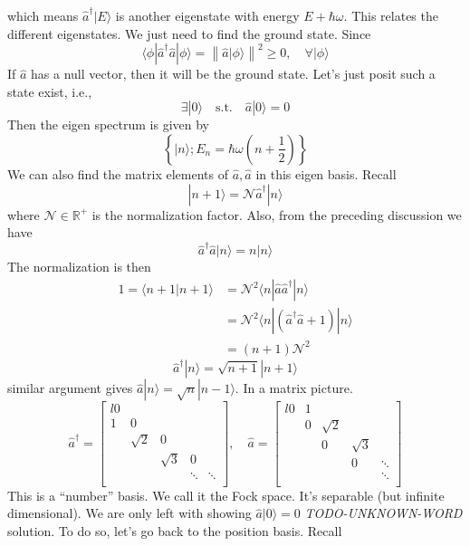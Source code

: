 which means $\hat{a}^{\dagger}|E\rangle$ is another eigenstate with energy $E+\hbar\omega$. This relates the different eigenstates. We just need to find the ground state. Since
\[ \langle \phi |\hat{a}^{\dagger}\hat{a}|\phi \rangle =\left\| \hat{a}|\phi \rangle \right\| ^2\ge 0,\quad \forall |\phi \rangle \]
If $\hat{a}$ has a null vector, then it will be the ground state. Let's just posit such a state exist, i.e.,
\[ \exists |0\rangle \quad \mathrm{s}.\mathrm{t}.\quad \hat{a}|0\rangle =0\]
Then the eigen spectrum is given by
\[ \left\{ |n\rangle ;E_n=\hbar \omega \left( n+\frac{1}{2} \right) \right\} \]
We can also find the matrix elements of $\hat{a},\hat{a}$ in this eigen basis. Recall
\[ |n+1\rangle =\mathcal{N} \hat{a}^{\dagger}|n\rangle \]
where $\mathcal{N}\in\mathbb{R}^+$ is the normalization factor. Also, from the preceding discussion we have
\[ \hat{a}^{\dagger}\hat{a}|n\rangle =n|n\rangle \]
The normalization is then
\begin{align*}
    1=\langle n+1|n+1\rangle &=\mathcal{N} ^2\langle n|\hat{a}\hat{a}^{\dagger}|n\rangle \\
    &=\mathcal{N} ^2\langle n|\left( \hat{a}^{\dagger}\hat{a}+1 \right) |n\rangle \\
    &=\left( n+1 \right) \mathcal{N} ^2
\end{align*}
\[ \hat{a}^{\dagger}|n\rangle =\sqrt{n+1}|n+1\rangle \]
similar argument gives $\hat{a}|n\rangle =\sqrt{n}|n-1\rangle$. In a matrix picture.
\[ \hat{a}^\dagger=\left[ \begin{matrix}{l}
	0&		&		&		&		\\
	1&		0&		&		&		\\
	&		\sqrt{2}&		0&		&		\\
	&		&		\sqrt{3}&		0&		\\
	&		&		&		\ddots&		\ddots\\
\end{matrix} \right] ,\quad \hat{a}=\left[ \begin{matrix}{l}
	0&		1&		&		&		\\
	&		0&		\sqrt{2}&		&		\\
	&		&		0&		\sqrt{3}&		\\
	&		&		&		0&		\ddots\\
	&		&		&		&		\ddots\\
\end{matrix} \right] \]
This is a ``number'' basis. We call it the Fock space. It's separable (but infinite dimensional). We are only left with showing $\hat{a}|0\rangle =0$ \emph{TODO-UNKNOWN-WORD} solution. To do so, let's go back to the position basis. Recall

